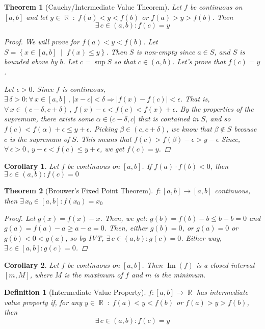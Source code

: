 \documentclass[12pt]{article}
\let\RA\Rightarrow
\newcommand{\set}[2]{\left\{{#1}\;\middle|\;{#2}\right\}}
\newcommand{\Forall}[1]{\forall\,{#1}\,,\,}
\newcommand{\Exist}[1]{\exists\,{#1}:}
\DeclareMathOperator{\R}{\mathbb{R}}
\DeclareMathOperator{\Image}{Im}
\newtheorem{theorem}{Theorem}[subsection]
\newtheorem{definition}{Definition}[subsection]
\newtheorem{corollary}{Corollary}[subsection]
\begin{document}
\begin{theorem}[Cauchy/Intermediate Value Theorem]
  Let $f$ be continuous on $[a,b]$ and let $y\in\R\;:\;f(a)<y<f(b)$ or $f(a)>y>f(b)$. Then $$\Exist{c\in (a,b)} f(c)=y$$
  \begin{proof}
    We will prove for $f(a)<y<f(b)$. Let $S=\set{x\in [a,b]}{f(x)\leq y}$. Then $S$ is non-empty since $a\in S$, and $S$ is bounded above by $b$. Let $c=\sup S$ so that $c\in(a,b)$. Let's prove that $f(c)=y$.

    Let $\epsilon>0$. Since $f$ is continuous, $\Exist{\delta >0}\Forall{x\in[a,b]}|x-c|<\delta\RA|f(x)-f(c)|<\epsilon$. That is, $\Forall{x\in (c-\delta ,c+\delta)}f(x)-\epsilon <f(c)<f(x)+\epsilon$. By the properties of the supremum, there exists some $\alpha\in (c-\delta ,c]$ that is contained in $S$, and so $f(c)<f(\alpha)+\epsilon \leq y+\epsilon$. Picking $\beta\in (c,c+\delta )$, we know that $\beta\notin S$ because $c$ is the supremum of $S$. This means that $f(c)>f(\beta)-\epsilon >y-\epsilon$
    Since, $\Forall{\epsilon >0} y-\epsilon <f(c)\leq y+\epsilon$, we get $f(c)=y$.
  \end{proof}
\end{theorem}

\begin{corollary}
  Let $f$ be continuous on $[a,b]$. If $f(a)\cdot f(b)<0$, then $\Exist{c\in(a,b)}f(c)=0$
\end{corollary}

\begin{theorem}[Brouwer's Fixed Point Theorem]
  $f:[a,b]\to[a,b]$ continuous, then $\Exist{x_0\in[a,b]} f(x_0)=x_0$
  \begin{proof}
    Let $g(x)=f(x)-x$. Then, we get: $g(b)=f(b)-b\leq b-b=0$ and $g(a)=f(a)-a\geq a-a=0$. Then, either $g(b)=0$, or $g(a)=0$ or $g(b)<0<g(a)$, so by IVT, $\Exist{c\in (a,b)} g(c)=0$. Either way, $\Exist{c\in[a,b]}g(c)=0$.
  \end{proof}
\end{theorem}

\begin{corollary}
  Let $f$ be continuous on $[a,b]$. Then $\Image(f)$ is a closed interval $[m,M]$, where $M$ is the maximum of $f$ and $m$ is the minimum.
\end{corollary}

\begin{definition}[Intermediate Value Property]
  $f:[a,b]\to\R$ has intermediate value property if, for any $y\in\R\;:\;f(a)<y<f(b)$ or $f(a)>y>f(b)$, then $$\Exist{c\in (a,b)} f(c)=y$$ 
\end{definition}
\end{document}
